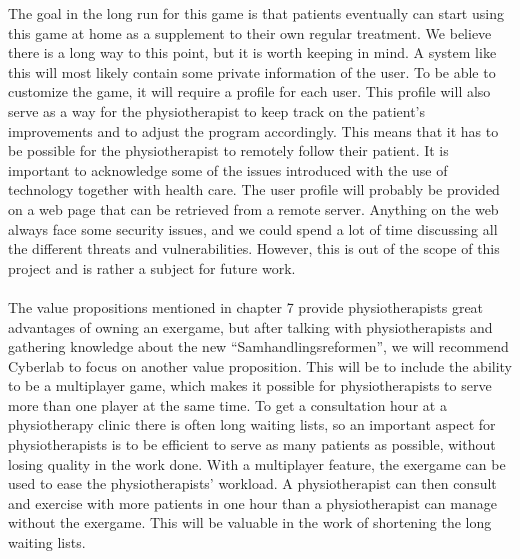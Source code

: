 The goal in the long run for this game is that patients eventually can start using this game at home as a supplement to their own regular treatment. We believe there is a long way to this point, but it is worth keeping in mind. A system like this will most likely contain some private information of the user. To be able to customize the game, it will require a profile for each user. This profile will also serve as a way for the physiotherapist to keep track on the patient’s improvements and to adjust the program accordingly. This means that it has to be possible for the physiotherapist to remotely follow their patient. It is important to acknowledge some of the issues introduced with the use of technology together with health care. The user profile will probably be provided on a web page that can be retrieved from a remote server. Anything on the web always face some security issues, and we could spend a lot of time discussing all the different threats and vulnerabilities. However, this is out of the scope of this project and is rather a subject for future work. \\ \\ 
The value propositions mentioned in chapter 7 provide physiotherapists great advantages of owning an exergame, but after talking with physiotherapists and gathering knowledge about the new “Samhandlingsreformen”, we will recommend Cyberlab to focus on another value proposition. This will be to include the ability to be a multiplayer game, which makes it possible for physiotherapists to serve more than one player at the same time. To get a consultation hour at a physiotherapy clinic there is often long waiting lists, so an important aspect for physiotherapists is to be efficient to serve as many patients as possible, without losing quality in the work done. With a multiplayer feature, the exergame can be used to ease the physiotherapists’ workload. A physiotherapist can then consult and exercise with more patients in one hour than a physiotherapist can manage without the exergame. This will be valuable in the work of shortening the long waiting lists. \\ \\
